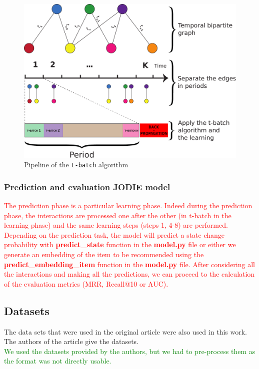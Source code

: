 \begin{figure}[htbp]
    \centering
    \includegraphics[width=.7\textwidth]{image/pipeline_t-batch.pdf}
    \caption{Pipeline of the \texttt{t-batch} algorithm}
    \label{pipeline_t-batch}
\end{figure}

\subsubsection{Prediction and evaluation JODIE model}
\textcolor{red}{The prediction phase is a particular learning phase. Indeed during the prediction phase, the interactions are processed one after the other (in t-batch in the learning phase) and the same learning steps (steps 1, 4-8) are performed. Depending on the prediction task, the model will predict a state change probability with \textbf{predict\_state} function in the \textbf{model.py} file or either we generate an embedding of the item to be recommended using the \textbf{predict\_embedding\_item} function in the \textbf{model.py} file. After considering all the interactions and making all the predictions, we can proceed to the calculation of the evaluation metrics (MRR, Recall@10 or AUC).}


\subsection{Datasets}
 
The data sets that were used in the original article were also used in this work. The authors of the article give the datasets. \\

\textcolor{green}{We used the datasets provided by the authors, but we had to pre-process them as the format was not directly usable.} \\

